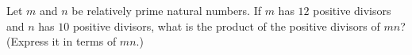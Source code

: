 Let $m$ and $n$ be relatively prime natural numbers. If $m$ has $12$ positive divisors and $n$ has $10$ positive divisors, what is the product of the positive divisors of $mn$? (Express it in terms of $mn$.)
